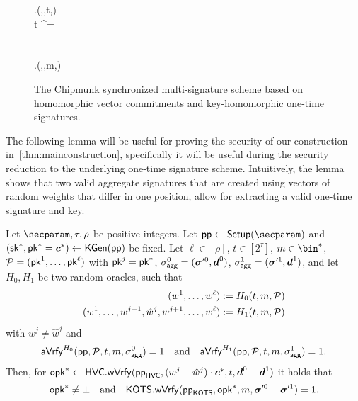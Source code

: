 \begin{figure}[p]
\begin{pchstack}
\begin{pcvstack}
{    \opk \gets \hvc.\sverify(\hvcparams,,t,)\\
    \pcif t ^\tau \pcor \opk = \bot\\
    \quad {}\\
    \pcelse\\
    \quad \pcreturn \hots.\sverify(\hotsparams,\opk,m,\otsig)
  }
  \pcvspace
\end{pcvstack}
\end{pchstack}
\caption{The Chipmunk synchronized multi-signature scheme based on homomorphic vector commitments and key-homomorphic one-time signatures.}
\label{fig:nidvconst}
\end{figure}
%
\iffalse
The following lemma will be useful for proving the security of our construction in~\autoref{thm:mainconstruction}, specifically it will be useful during the security reduction to the underlying one-time signature scheme.
Intuitively, the lemma shows that two valid aggregate signatures that are created using vectors of random weights that differ in one position, allow for extracting a valid one-time signature and key.

\begin{lemma}\label{lem:forkingisuseful}
  Let $\secparam,\tau,\rho$ be positive integers.
  Let $\params\gets\setup(\secparam)$ and $(\mathsf{sk}^*,\mathsf{pk}^*=\boldsymbol{c}^*) \gets\mathsf{KGen}(\mathsf{pp})$ be fixed.
  Let $\ell\in[\rho]$, $t\in[2^\tau]$, $m\in\bin^*$, $\mathcal{P} = (\mathsf{pk}^1,\dots,\mathsf{pk}^{\ell})$ with $\mathsf{pk}^j=\mathsf{pk}^*$, $\sigma_\mathsf{agg}^0=(\boldsymbol{\sigma}'^0,\boldsymbol{d}^0)$, $\sigma_\mathsf{agg}^1=(\boldsymbol{\sigma}'^1,\boldsymbol{d}^1)$, and let $H_0,H_1$ be two random oracles, such that 
  \begin{align*}
    (w^1,\dots,w^{\ell}) &:= H_0(t,m,\mathcal{P})\\
    (w^1,\dots,w^{j-1},\hat{w}^j,w^{j+1},\dots,w^{\ell}) &:= H_1(t,m,\mathcal{P})
  \end{align*}
  with $w^j\neq \hat{w}^j$ and
  \[
    \mathsf{aVrfy}^{H_0}(\mathsf{pp},\mathcal{P},t,m,\sigma_\mathsf{agg}^0)=1 \quad \text{and} \quad \mathsf{aVrfy}^{H_1}(\mathsf{pp},\mathcal{P},t,m,\sigma_\mathsf{agg}^1)=1.
  \]
  Then, for $\mathsf{opk}^*\gets\mathsf{HVC}.\mathsf{wVrfy}(\mathsf{pp}_{\mathsf{HVC}},(w^j-\hat{w}^j)\cdot \boldsymbol{c}^*,t,\boldsymbol{d}^0-\boldsymbol{d}^1)$ it holds that
  \[
    \mathsf{opk}^* \neq \bot \quad \text{and} \quad \mathsf{KOTS}.\mathsf{wVrfy}(\mathsf{pp}_{\mathsf{KOTS}},\mathsf{opk}^*,m,\boldsymbol{\sigma}'^0-\boldsymbol{\sigma}'^1) = 1.
  \]
\end{lemma}

